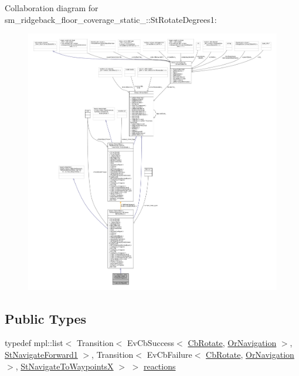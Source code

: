 Collaboration diagram for sm\+\_\+ridgeback\+\_\+floor\+\_\+coverage\+\_\+static\+\_\+:\+:St\+Rotate\+Degrees1\+:
\nopagebreak
\begin{figure}[H]
\begin{center}
\leavevmode
\includegraphics[width=350pt]{structsm__ridgeback__floor__coverage__static__1_1_1StRotateDegrees1__coll__graph}
\end{center}
\end{figure}
\subsection*{Public Types}
\begin{DoxyCompactItemize}
\item 
typedef mpl\+::list$<$ Transition$<$ Ev\+Cb\+Success$<$ \hyperlink{classcl__move__base__z_1_1CbRotate}{Cb\+Rotate}, \hyperlink{classsm__ridgeback__floor__coverage__static__1_1_1OrNavigation}{Or\+Navigation} $>$, \hyperlink{structsm__ridgeback__floor__coverage__static__1_1_1StNavigateForward1}{St\+Navigate\+Forward1} $>$, Transition$<$ Ev\+Cb\+Failure$<$ \hyperlink{classcl__move__base__z_1_1CbRotate}{Cb\+Rotate}, \hyperlink{classsm__ridgeback__floor__coverage__static__1_1_1OrNavigation}{Or\+Navigation} $>$, \hyperlink{structsm__ridgeback__floor__coverage__static__1_1_1StNavigateToWaypointsX}{St\+Navigate\+To\+WaypointsX} $>$ $>$ \hyperlink{structsm__ridgeback__floor__coverage__static__1_1_1StRotateDegrees1_ab1b48d10574fef0590b07889884c45e6}{reactions}
\end{DoxyCompactItemize}
